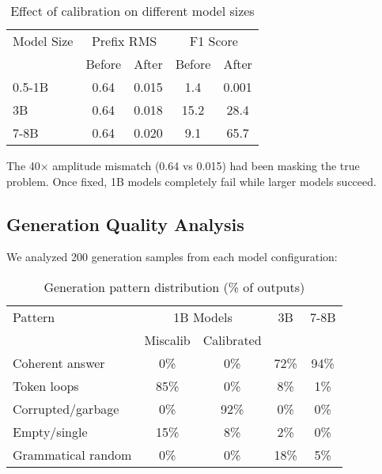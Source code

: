 \documentclass{article}
\begin{document}
\begin{table}[h]
\caption{Effect of calibration on different model sizes}
\label{tab:calibration_effect}
\vskip 0.15in
\begin{center}
\begin{small}
\begin{tabular}{lcccc}
\toprule
Model Size & \multicolumn{2}{c}{Prefix RMS} & \multicolumn{2}{c}{F1 Score} \\
 & Before & After & Before & After \\
\midrule
0.5-1B & 0.64 & 0.015 & 1.4 & 0.001 \\
3B & 0.64 & 0.018 & 15.2 & 28.4 \\
7-8B & 0.64 & 0.020 & 9.1 & 65.7 \\
\bottomrule
\end{tabular}
\end{small}
\end{center}
\vskip -0.1in
\end{table}

The 40$\times$ amplitude mismatch (0.64 vs 0.015) had been masking the true problem. Once fixed, 1B models completely fail while larger models succeed.

\subsection{Generation Quality Analysis}

We analyzed 200 generation samples from each model configuration:

\begin{table}[h]
\caption{Generation pattern distribution (\% of outputs)}
\label{tab:generation_patterns_extended}
\vskip 0.15in
\begin{center}
\begin{small}
\begin{tabular}{lcccc}
\toprule
Pattern & \multicolumn{2}{c}{1B Models} & 3B & 7-8B \\
 & Miscalib & Calibrated & & \\
\midrule
Coherent answer & 0\% & 0\% & 72\% & 94\% \\
Token loops & 85\% & 0\% & 8\% & 1\% \\
Corrupted/garbage & 0\% & 92\% & 0\% & 0\% \\
Empty/single & 15\% & 8\% & 2\% & 0\% \\
Grammatical random & 0\% & 0\% & 18\% & 5\% \\
\bottomrule
\end{tabular}
\end{small}
\end{center}
\vskip -0.1in
\end{table}
\end{document}
